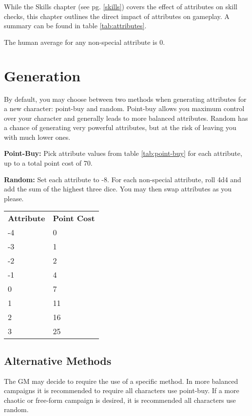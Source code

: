 \begin{multicols*}{2}
    While the Skills chapter (see pg. \ref{skills}) covers the effect of attributes
    on skill checks, this chapter outlines the direct impact of attributes on
    gameplay. A summary can be found in table \ref{tab:attributes}.

    The human average for any non-special attribute is 0.

    \section{Generation}
    By default, you may choose between two methods when generating attributes
    for a new character: point-buy and random. Point-buy allows you maximum
    control over your character and generally leads to more balanced
    attributes. Random has a chance of generating very powerful attributes, but
    at the risk of leaving you with much lower ones.
    
    \textbf{Point-Buy:} Pick attribute values from table \ref{tab:point-buy}
    for each attribute, up to a total point cost of 70.

    \textbf{Random:} Set each attribute to -8. For each non-special attribute,
    roll 4d4 and add the sum of the highest three dice. You may then swap
    attributes as you please.

    {
        \setlength\parindent{0pt}
        \unclassedrowcolors
        \begin{tabularx}{0.5\textwidth}{l X}
            \textbf{Attribute} & \textbf{Point Cost} \\
            -4 & 0 \\
            -3 & 1 \\
            -2 & 2 \\
            -1 & 4 \\
            0 & 7 \\
            1 & 11 \\
            2 & 16 \\
            3 & 25 \\
        \end{tabularx}
        \label{tab:point-buy}
    }

    \subsection{Alternative Methods}
    The GM may decide to require the use of a specific method. In more balanced
    campaigns it is recommended to require all characters use point-buy. If a
    more chaotic or free-form campaign is desired, it is recommended all
    characters use random.


\end{multicols*}
